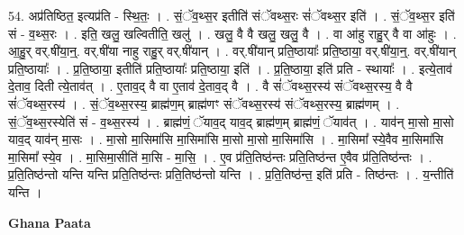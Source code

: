 \documentclass[17pt]{extarticle}
\begin{document}
54. अप्र॑तिष्ठित॒ इत्यप्र॑ति - स्थि॒तः॒ । . सं॒ॅव॒थ्स॒र इतीति॑ संॅवथ्स॒रः सं॑ॅवथ्स॒र इति॑ । . सं॒ॅव॒थ्स॒र इति॑ सं - व॒थ्स॒रः । . इति॒ खलु॒ खल्वितीति॒ खलु॑ । . खलु॒ वै वै खलु॒ खलु॒ वै । . वा आ॑हु राहु॒र् वै वा आ॑हुः । . आ॒हु॒र् वर्.षी॑या॒न्॒. वर्.षी॑या नाहु राहु॒र् वर्.षी॑यान् । . वर्.षी॑यान् प्रति॒ष्ठायाः᳚ प्रति॒ष्ठाया॒ वर्.षी॑या॒न्॒. वर्.षी॑यान् प्रति॒ष्ठायाः᳚ । . प्र॒ति॒ष्ठाया॒ इतीति॑ प्रति॒ष्ठायाः᳚ प्रति॒ष्ठाया॒ इति॑ । . प्र॒ति॒ष्ठाया॒ इति॑ प्रति - स्थायाः᳚ । . इत्ये॒ताव॑ दे॒ताव॒ दिती त्ये॒ताव॑त् । . ए॒ताव॒द् वै वा ए॒ताव॑ दे॒ताव॒द् वै । . वै सं॑ॅवथ्स॒रस्य॑ संॅवथ्स॒रस्य॒ वै वै सं॑ॅवथ्स॒रस्य॑ । . सं॒ॅव॒थ्स॒रस्य॒ ब्राह्म॑ण॒म् ब्राह्म॑णꣳ संॅवथ्स॒रस्य॑ संॅवथ्स॒रस्य॒ ब्राह्म॑णम् । . सं॒ॅव॒थ्स॒रस्येति॑ सं - व॒थ्स॒रस्य॑ । . ब्राह्म॑णं॒ ॅयाव॒द् याव॒द् ब्राह्म॑ण॒म् ब्राह्म॑णं॒ ॅयाव॑त् । . याव॑न् मा॒सो मा॒सो याव॒द् याव॑न् मा॒सः । . मा॒सो मा॒सिमा॑सि मा॒सिमा॑सि मा॒सो मा॒सो मा॒सिमा॑सि । . मा॒सिमा᳚ स्ये॒वैव मा॒सिमा॑सि मा॒सिमा᳚ स्ये॒व । . मा॒सिमा॒सीति॑ मा॒सि - मा॒सि॒ । . ए॒व प्र॑ति॒तिष्ठ॑न्तः प्रति॒तिष्ठ॑न्त ए॒वैव प्र॑ति॒तिष्ठ॑न्तः । . प्र॒ति॒तिष्ठ॑न्तो यन्ति यन्ति प्रति॒तिष्ठ॑न्तः प्रति॒तिष्ठ॑न्तो यन्ति । . प्र॒ति॒तिष्ठ॑न्त॒ इति॑ प्रति - तिष्ठ॑न्तः । . य॒न्तीति॑ यन्ति । \newline

\textbf{Ghana Paata } \newline
\end{document}
